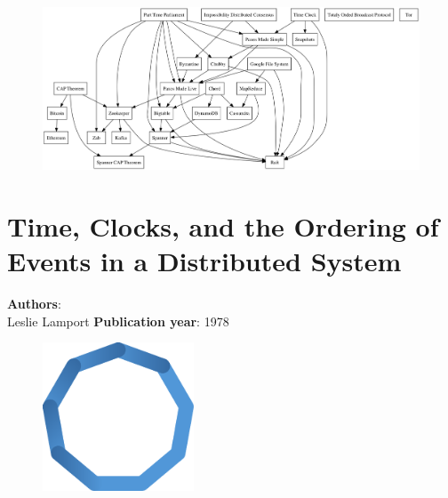 \documentclass[11pt,fleqn]{book} %
\begin{document}
\vspace*{5mm}

\begin{figure}[h]
\centering
\includegraphics[width=1\textwidth]{dependency}
\end{figure}

\chapter{Time, Clocks, and the Ordering of Events in a Distributed System}
\vspace*{-7mm}
\Large \textbf{Authors}: \\
Leslie Lamport
\newline\newline
\textbf{Publication year}: 1978
\begin{figure}[b]
    \centering
    \includegraphics[width=0.4\textwidth]{distributed-systems-blue.pdf}
\end{figure}

\end{document}
